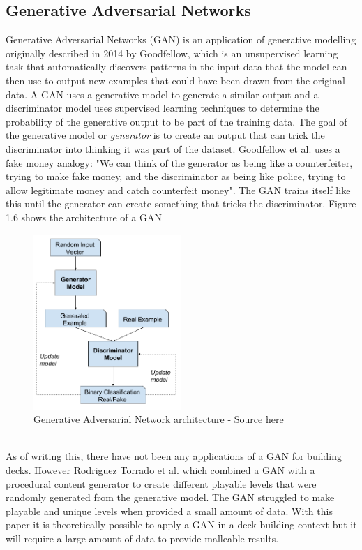 \documentclass{report}
\begin{document}
\subsection{Generative Adversarial Networks}
Generative Adversarial Networks (GAN) is an application of generative modelling originally described in 2014 by Goodfellow\cite{NIPS2014}, which is an unsupervised learning task that automatically discovers patterns in the input data that the model can then use to output new examples that could have  been drawn from the original data. A GAN uses a generative model to generate a similar output and a discriminator model uses supervised learning techniques to determine the probability of the generative output to be part of the training data\cite{NIPS2014}. The goal of the generative model or \textit{generator} is to create an output that can trick the discriminator into thinking it was part of the dataset. Goodfellow et al. uses a fake money analogy: "We can think of the generator as being like a counterfeiter, trying to make fake money, and the discriminator as being like police, trying to allow legitimate money and catch counterfeit money"\cite{NIPS2016}. The GAN trains itself like this until the generator can create something that tricks the discriminator. Figure 1.6 shows the architecture of a GAN\\ 
\begin{figure}[h]
\centering
\includegraphics[width=0.5\textwidth]{GAN}
\caption{Generative Adversarial Network architecture - Source
 \href{https://machinelearningmastery.com/what-are-generative-adversarial-networks-gans/}{here} }
\end{figure}
\\
\indent As of writing this, there have not been any applications of a GAN for building decks. However Rodriguez Torrado et al. which combined a GAN with a procedural content generator to create different playable levels that were randomly generated from the generative model\cite{VGLG}. The GAN struggled to make playable and unique levels when provided a small amount of data. With this paper it is theoretically possible to apply a GAN in a deck building context but it will require a large amount of data to provide malleable results. 
\end{document}
